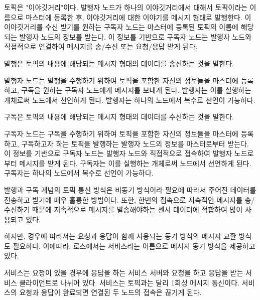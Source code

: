 \begin{definition}[토픽(topic)]
토픽은 "이야깃거리"이다. 발행자 노드가 하나의 이야깃거리에서 대해서 토픽이라는 이름으로 마스터에 등록한 후, 이야깃거리에 대한 이야기를 메시지 형태로 발행한다. 이 이야깃거리를 수신 받기를 원하는 구독자 노드는 마스터에 등록된 토픽의 이름에 해당되는 발행자 노드의 정보를 받는다. 이 정보를 기반으로 구독자 노드는 발행자 노드와 직접적으로 연결하여 메시지를 송/수신 또는 요청/응답 받게 된다. 
\end{definition}

\begin{definition}
발행은 토픽의 내용에 해당되는 메시지 형태의 데이터를 송신하는 것을 말한다. 

발행자 노드는 발행을 수행하기 위하여 토픽을 포함한 자신의 정보들을 마스터에 등록하고, 구독을 원하는 구독자 노드에게 메시지를 보내게 된다. 발행자는 이를 실행하는 개체로써 노드에서 선언하게 된다. 발행자는 하나의 노드에서 복수로 선언이 가능하다.
\end{definition}

\begin{definition}
구독은 토픽의 내용에 해당되는 메시지 형태의 데이터를 수신하는 것을 말한다. 

구독자 노드는 구독을 수행하기 위하여 토픽을 포함한 자신의 정보들을 마스터에 등록하고, 구독하고자 하는 토픽을 발행하는 발행자 노드의 정보를 마스터로부터 받는다. 이 정보를 기반으로 구독자 노드는 발행자 노드와 직접적으로 접속하여 발행자 노드로부터 메시지를 받게 된다. 구독자는 이를 실행하는 개체로써 노드에서 선언하게 된다. 구독자는 하나의 노드에서 복수로 선언이 가능하다.
\end{definition}

\begin{definition}
발행과 구독 개념의 토픽 통신 방식은 비동기 방식이라 필요에 따라서 주어진 데이터를 전송하고 받기에 매우 훌륭한 방법이다. 또한, 한번의 접속으로 지속적인 메시지를 송/수신하기 때문에 지속적으로 메시지를 발송해야하는 센서 데이터에 적합하여 많이 사용되고 있다. 

하지만, 경우에 따라서는 요청과 응답이 함께 사용되는 동기 방식의 메시지 교환 방식도 필요하다. 이에따라, 로스에서는 서비스라는 이름으로 메시지 동기 방식을 제공하고 있다. 

서비스는 요청이 있을 경우에 응답을 하는 서비스 서버와 요청을 하고 응답을 받는 서비스 클라이언트로 나뉘어 있다. 서비스는 토픽과는 달리 1회성 메시지 통신이다. 서비스의 요청과 응답이 완료되면 연결된 두 노드의 접속은 끊기게 된다. 
\end{definition}

